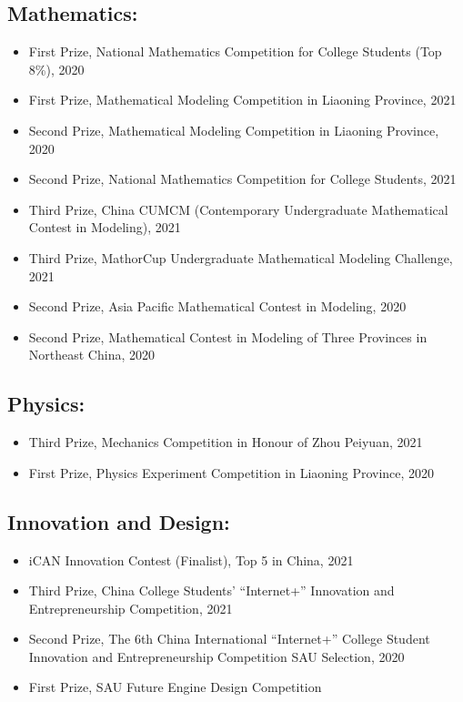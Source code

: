 \documentclass[11pt]{article}
\begin{document}
\subsection*{Mathematics:}
\begin{itemize}[leftmargin=*,itemsep=1pt]
    \item First Prize, National Mathematics Competition for College Students (Top 8\%), 2020
    \item First Prize, Mathematical Modeling Competition in Liaoning Province, 2021
    \item Second Prize, Mathematical Modeling Competition in Liaoning Province, 2020
    \item Second Prize, National Mathematics Competition for College Students, 2021
    \item Third Prize, China CUMCM (Contemporary Undergraduate Mathematical Contest in Modeling), 2021
    \item Third Prize, MathorCup Undergraduate Mathematical Modeling Challenge, 2021
    \item Second Prize, Asia Pacific Mathematical Contest in Modeling, 2020
    \item Second Prize, Mathematical Contest in Modeling of Three Provinces in Northeast China, 2020
\end{itemize}

\subsection*{Physics:}
\begin{itemize}[leftmargin=*,itemsep=1pt]
    \item Third Prize, Mechanics Competition in Honour of Zhou Peiyuan, 2021
    \item First Prize, Physics Experiment Competition in Liaoning Province, 2020
\end{itemize}

\subsection*{Innovation and Design:}
\begin{itemize}[leftmargin=*,itemsep=1pt]
    \item iCAN Innovation Contest (Finalist), Top 5 in China, 2021
    \item Third Prize, China College Students' “Internet+” Innovation and Entrepreneurship Competition, 2021
    \item Second Prize, The 6th China International “Internet+” College Student Innovation and Entrepreneurship Competition SAU Selection, 2020
    \item First Prize, SAU Future Engine Design Competition
\end{itemize}
\end{document}
